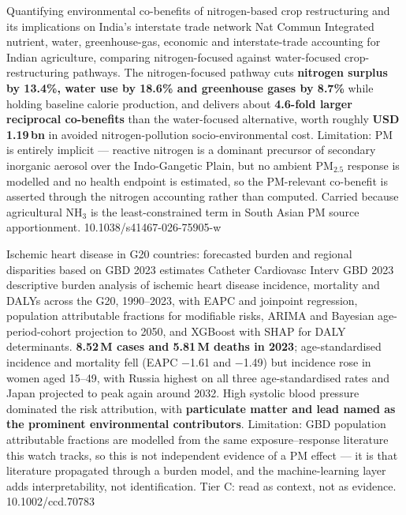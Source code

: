 \documentclass[10pt]{article}
\begin{document}
{Quantifying environmental co-benefits of nitrogen-based crop restructuring and its
implications on India's interstate trade network}
{Nat Commun}
{Integrated nutrient, water, greenhouse-gas, economic and interstate-trade accounting for
Indian agriculture, comparing nitrogen-focused against water-focused crop-restructuring
pathways. The nitrogen-focused pathway cuts \textbf{nitrogen surplus by 13.4\%, water use
by 18.6\% and greenhouse gases by 8.7\%} while holding baseline calorie production, and
delivers about \textbf{4.6-fold larger reciprocal co-benefits} than the water-focused
alternative, worth roughly \textbf{USD 1.19\,bn} in avoided nitrogen-pollution
socio-environmental cost. Limitation: PM is entirely implicit --- reactive nitrogen is a
dominant precursor of secondary inorganic aerosol over the Indo-Gangetic Plain, but no
ambient PM$_{2.5}$ response is modelled and no health endpoint is estimated, so the
PM-relevant co-benefit is asserted through the nitrogen accounting rather than computed.
Carried because agricultural NH$_3$ is the least-constrained term in South Asian PM
source apportionment.}
{10.1038/s41467-026-75905-w}


{Ischemic heart disease in G20 countries: forecasted burden and regional disparities
based on GBD 2023 estimates}
{Catheter Cardiovasc Interv}
{GBD 2023 descriptive burden analysis of ischemic heart disease incidence, mortality and
DALYs across the G20, 1990--2023, with EAPC and joinpoint regression, population
attributable fractions for modifiable risks, ARIMA and Bayesian age-period-cohort
projection to 2050, and XGBoost with SHAP for DALY determinants. \textbf{8.52\,M cases
and 5.81\,M deaths in 2023}; age-standardised incidence and mortality fell (EAPC $-$1.61
and $-$1.49) but incidence rose in women aged 15--49, with Russia highest on all three
age-standardised rates and Japan projected to peak again around 2032. High systolic blood
pressure dominated the risk attribution, with \textbf{particulate matter and lead named as
the prominent environmental contributors}. Limitation: GBD population attributable
fractions are modelled from the same exposure--response literature this watch tracks, so
this is not independent evidence of a PM effect --- it is that literature propagated
through a burden model, and the machine-learning layer adds interpretability, not
identification. Tier C: read as context, not as evidence.}
{10.1002/ccd.70783}
\end{document}
